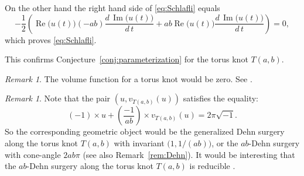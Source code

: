\documentclass[a4paper]{amsart}
\theoremstyle{plain}
\theoremstyle{definition}
\theoremstyle{remark}
\newtheorem{rem}[thm]{Remark}
\renewcommand{\Re}{\operatorname{Re}}
\renewcommand{\Im}{\operatorname{Im}}
\numberwithin{equation}{section}
\begin{document}
On the other hand the right hand side of \eqref{eq:Schlafli} equals
\begin{equation*}
  -\frac{1}{2}
  \left(
    \Re\bigl(u(t)\bigr)
    (-ab)
    \frac{d\,\Im\bigl(u(t)\bigr)}{d\,t}
   +ab\Re\bigl(u(t)\bigr)
    \frac{d\,\Im\bigl(u(t)\bigr)}{d\,t}
  \right)
  =
  0,
\end{equation*}
which proves \eqref{eq:Schlafli}.
\par
This confirms Conjecture~\ref{conj:parameterization} for the torus knot $T(a,b)$.
\begin{rem}
The volume function for a torus knot would be zero.
See \cite[Appendix~B]{Garoufalidis/Le:Kauffman}.
\end{rem}
\begin{rem}
Note that the pair $\left(u,v_{T(a,b)}(u)\right)$ satisfies the equality:
\begin{equation*}
  (-1)\times{u}+\left(\frac{-1}{ab}\right)\times{v_{T(a,b)}(u)}=2\pi\sqrt{-1}.
\end{equation*}
So the corresponding geometric object would be the generalized Dehn surgery along the torus knot $T(a,b)$ with invariant $\bigl(1,1/(ab)\bigr)$, or the $ab$-Dehn surgery with cone-angle $2ab\pi$
\cite[Chapter~4, \S~4.5]{Thurston:GT3M} (see also Remark~\ref{rem:Dehn}).
It would be interesting that the $ab$-Dehn surgery along the torus knot $T(a,b)$ is reducible \cite{Moser:PACJM1971}.
\end{rem}
\end{document}
